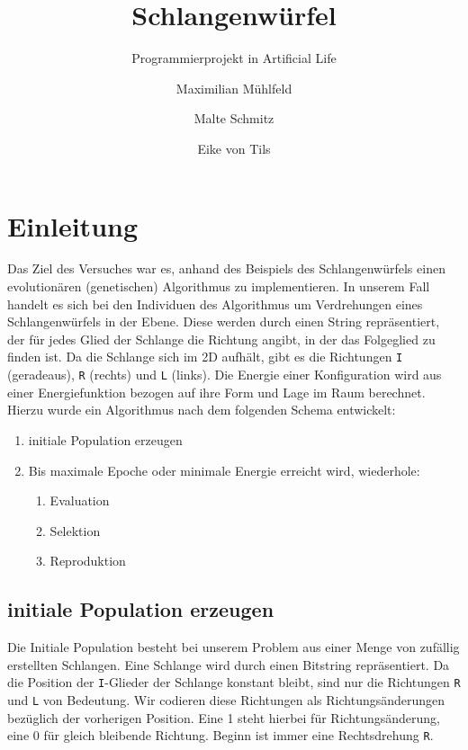 \documentclass[parskip=half,paper=a4]{scrartcl}
\title{Schlangenwürfel}
\subtitle{Programmierprojekt in Artificial Life}
\author{Maximilian Mühlfeld \and Malte Schmitz \and Eike von Tils}
\begin{document}
  \maketitle
  \tableofcontents

  \section{Einleitung}
    Das Ziel des Versuches war es, anhand des Beispiels des Schlangenwürfels einen
    evolutionären (genetischen) Algorithmus zu implementieren. In unserem Fall
    handelt es sich bei den Individuen des Algorithmus um Verdrehungen
    eines Schlangenwürfels in der Ebene. Diese werden durch einen String
    repräsentiert, der für jedes Glied der Schlange die Richtung angibt, in der
    das Folgeglied zu finden ist. Da die Schlange sich im 2D aufhält, gibt es die
    Richtungen \texttt{I} (geradeaus), \texttt{R} (rechts) und
    \texttt{L} (links). Die Energie einer Konfiguration wird aus einer
    Energiefunktion bezogen auf ihre Form und Lage im Raum berechnet.\\
    Hierzu wurde ein Algorithmus nach dem folgenden Schema entwickelt:
    \begin{enumerate}
      \item initiale Population erzeugen 
      \item Bis maximale Epoche oder minimale Energie erreicht wird, wiederhole:
        \begin{enumerate}
          \item Evaluation
          \item Selektion
          \item Reproduktion
        \end{enumerate}
      \end{enumerate}
  
  \subsection[initiale Population]{initiale Population erzeugen}
    Die Initiale Population besteht bei unserem Problem aus einer Menge von
    zufällig erstellten Schlangen. Eine Schlange wird durch einen
    Bitstring repräsentiert. Da die Position der \texttt{I}-Glieder der Schlange
    konstant bleibt, sind nur die Richtungen \texttt{R} und \texttt{L} von
    Bedeutung. Wir codieren diese Richtungen als Richtungsänderungen
    bezüglich der vorherigen Position. Eine 1 steht hierbei für Richtungsänderung,
    eine 0 für gleich bleibende Richtung. Beginn ist immer eine Rechtsdrehung
    \texttt{R}.
    
\end{document}
